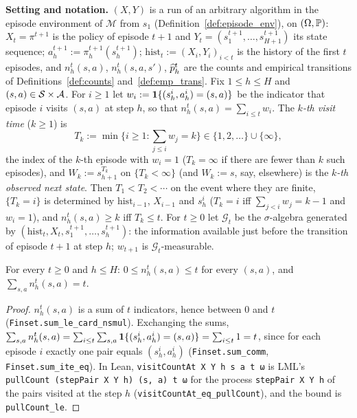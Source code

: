 \textbf{Setting and notation.} $(X, Y)$ is a run of an arbitrary algorithm in the episode
environment of $\mathcal M$ from $s_1$ (Definition~\ref{def:episode_env}), on $(\Omega, \mathbb{P})$:
$X_t = \pi^{t+1}$ is the policy of episode $t + 1$ and $Y_t = (s^{t+1}_1, \dots, s^{t+1}_{H+1})$
its state sequence; $a^{t+1}_h := \pi^{t+1}_h(s^{t+1}_h)$; $\mathrm{hist}_t := (X_i, Y_i)_{i < t}$
is the history of the first $t$ episodes, and $n^t_h(s,a)$, $n^t_h(s,a,s')$, $\widehat{p}^t_h$ are the
counts and empirical transitions of Definitions~\ref{def:counts} and~\ref{def:emp_trans}. Fix
$1 \le h \le H$ and $(s, a) \in \mathcal{S} \times \mathcal{A}$. For $i \ge 1$ let
$w_i := \mathbf{1}\{(s^i_h, a^i_h) = (s, a)\}$ be the indicator that episode $i$ visits $(s,a)$ at
step $h$, so that $n^t_h(s,a) = \sum_{i \le t} w_i$. The \emph{$k$-th visit time} ($k \ge 1$) is
\[
  T_k := \min\Big\{i \ge 1 : \sum_{j \le i} w_j = k\Big\} \in \{1, 2, \dots\} \cup \{\infty\},
\]
the index of the $k$-th episode with $w_i = 1$ ($T_k = \infty$ if there are fewer than $k$ such
episodes), and $W_k := s^{T_k}_{h+1}$ on $\{T_k < \infty\}$ (and $W_k := s$, say, elsewhere) is
the \emph{$k$-th observed next state}. Then $T_1 < T_2 < \cdots$ on the event where they are
finite, $\{T_k = i\}$ is determined by $\mathrm{hist}_{i-1}$, $X_{i-1}$ and $s^i_h$
($T_k = i$ iff $\sum_{j < i} w_j = k - 1$ and $w_i = 1$), and $n^t_h(s,a) \ge k$ iff $T_k \le t$.
For $t \ge 0$ let $\mathcal G_t$ be the $\sigma$-algebra generated by
$(\mathrm{hist}_t, X_t, s^{t+1}_1, \dots, s^{t+1}_h)$: the information available just before the
transition of episode $t + 1$ at step $h$; $w_{t+1}$ is $\mathcal G_t$-measurable.

\begin{lemma}\label{lem:count_le_episodes}
\leanok
{}
For every $t \ge 0$ and $h \le H$: $0 \le n^t_h(s,a) \le t$ for every $(s,a)$, and
$\sum_{s,a} n^t_h(s,a) = t$.
\end{lemma}

\begin{proof}
\leanok
$n^t_h(s,a)$ is a sum of $t$ indicators, hence between $0$ and $t$
(\texttt{Finset.sum\_le\_card\_nsmul}). Exchanging the sums,
$\sum_{s,a} n^t_h(s,a) = \sum_{i \le t}\sum_{s,a}\mathbf{1}\{(s^i_h, a^i_h) = (s,a)\} = \sum_{i \le t} 1 = t$,
since for each episode $i$ exactly one pair equals $(s^i_h, a^i_h)$ (\texttt{Finset.sum\_comm},
\texttt{Finset.sum\_ite\_eq}). In Lean, \texttt{visitCountAt X Y h s a t ω} is LML's
\texttt{pullCount (stepPair X Y h) (s, a) t ω} for the process \texttt{stepPair X Y h} of the
pairs visited at the step $h$ (\texttt{visitCountAt\_eq\_pullCount}), and the bound is
\texttt{pullCount\_le}.
\end{proof}

